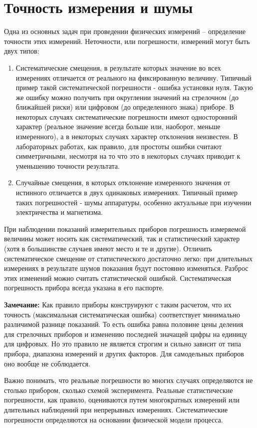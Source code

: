 \section{Точность измерения и шумы}

Одна из основных задач при проведении физических измерений -- определение точности этих измерений. Неточности, или погрешности, измерений могут быть двух типов:

\begin{enumerate}
	\item Систематические смещения, в результате которых значение во всех измерениях отличается от реального на фиксированную величину. Типичный пример такой систематической погрешности - ошибка установки нуля. Такую же ошибку можно получить при округлении значений на стрелочном (до ближайшей риски) или цифровом (до определенного знака) приборе. В некоторых случаях систематические погрешности имеют односторонний характер (реальное значение всегда больше или, наоборот, меньше измеренного), а в некоторых случаях характер отклонения неизвестен. В лабораторных работах, как правило, для простоты ошибки считают симметричными, несмотря на то что это в некоторых случаях приводит к уменьшению точности результата.

	\item Случайные смещения, в которых отклонение измеренного значения от истинного отличается в двух одинаковых измерениях. Типичный пример таких погрешностей - шумы аппаратуры, особенно актуальные при изучении электричества и магнетизма.
\end{enumerate}

При наблюдении показаний измерительных приборов погрешность измеряемой величины может носить как систематический, так и статистический характер (хотя в большинстве случаев имеют место и те и другие). Отличить систематическое смещение от статистического достаточно легко: при длительных измерениях в результате шумов показания будут постоянно изменяться. Разброс этих изменений можно считать статистической ошибкой. Систематическая погрешность прибора всегда указана в его паспорте.

\textbf{Замечание:} Как правило приборы конструируют с таким расчетом, что их точность (максимальная систематическая ошибка) соответствует минимально различимой разнице показаний. То есть ошибка равна половине цены деления для стрелочных приборов и изменению последней значащей цифры на единицу для цифровых. Но это правило не является строгим и сильно зависит от типа прибора, диапазона измерений и других факторов. Для самодельных приборов оно вообще не соблюдается.

Важно понимать, что реальные погрешности во многих случаях определяются не столько прибором, сколько схемой эксперимента. Реальные статистические погрешности, как правило, оцениваются путем многократных измерений или длительных наблюдений при непрерывных измерениях. Систематические погрешности определяются на основании физической модели процесса.